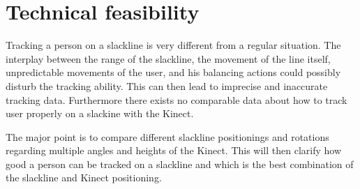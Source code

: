 \section{Technical feasibility}\label{5_3_technicalFeasibility}
Tracking a person on a slackline is very different from a regular situation. The interplay between the range of the slackline, the movement of the line itself, unpredictable movements of the user, and his balancing actions could possibly disturb the tracking ability. This can then lead to imprecise and inaccurate tracking data. Furthermore there exists no comparable data about how to track user properly on a slackine with the Kinect.

The major point is to compare different slackline positionings and rotations regarding multiple angles and heights of the Kinect. This will then clarify how good a person can be tracked on a slackline and which is the best combination of the slackline and Kinect positioning.

